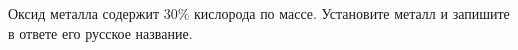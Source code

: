 
Оксид
металла содержит 30$\%$ кислорода по массе. 
Установите металл и запишите в ответе его русское название.



